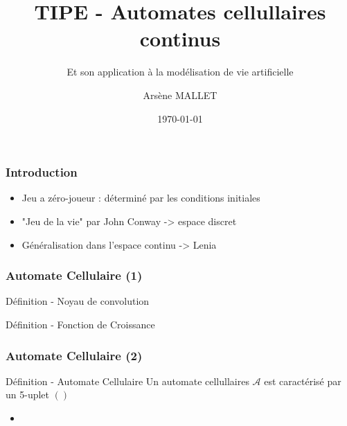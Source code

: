 \documentclass[aspectratio=43]{beamer}
\title[AutomateCellulaire]{TIPE - Automates cellullaires continus}
\subtitle{Et son application \`a la mod\'elisation de vie artificielle}
\author{Ars\`ene MALLET}
\date[\today]{\today}
\institute{Candidat - 22669}
\begin{document}
\begin{frame}
    \titlepage
\end{frame}

\begin{frame}
    \frametitle{Introduction}

    \begin{itemize}
        \setlength\itemsep{2em}
        \item Jeu a z\'ero-joueur : d\'etermin\'e par les
          conditions initiales
        \item "Jeu de la vie" par John Conway -> espace discret
        \item G\'en\'eralisation dans l'espace continu -> Lenia
    \end{itemize}
\end{frame}

\begin{frame}
    \frametitle{Automate Cellulaire (1)}

    \begin{alertblock}{D\'efinition - Noyau de convolution}
    
    \end{alertblock}

    \begin{alertblock}{D\'efinition - Fonction de Croissance}
    
    \end{alertblock}

\end{frame}

\begin{frame}
    \frametitle{Automate Cellulaire (2)}

    \begin{alertblock}{D\'efinition - Automate Cellulaire}
      Un automate cellullaires $\mathcal{A}$ est caract\'eris\'e par un 5-uplet
      $()$
      \begin{itemize}
        \item 
      \end{itemize}
    
    \end{alertblock}

    \begin{alertblock}{D\'efinition -  
    \end{alertblock}

\end{frame}
% 
\end{document}
